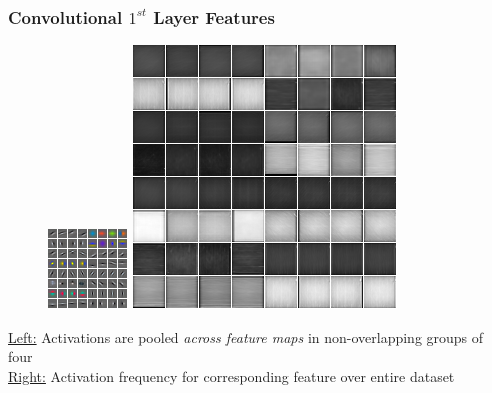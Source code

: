 \documentclass{beamer}
\begin{document}
\begin{frame}
\frametitle{Convolutional $1^{st}$ Layer Features}
\begin{center} 
\begin{figure} 
\includegraphics[scale=1.5]{./Figures/Project1/filters_slow.png} \hspace{0.5cm} 
\includegraphics[scale=0.45]{./Figures/Project1/act_large_slow.png}
\end{figure} 
\end{center} 
\underline{Left:} Activations are pooled \emph{across feature maps} in non-overlapping groups of four \\
\underline{Right:} Activation frequency for corresponding feature over entire dataset
\end{frame} 
\end{document}

